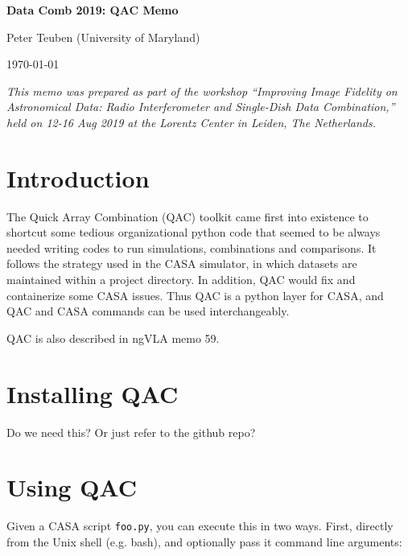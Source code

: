 \documentclass[12pt,a4paper]{article}
\begin{document}
\pagestyle{plain}
 

\begin{center}
{\Large{\bf{  Data Comb 2019: QAC Memo \\  }}} 

\end{center}
\bigskip

\centerline{Peter Teuben (University of Maryland)}

\centerline{\today}
\bigskip

\noindent \textit{This memo was prepared as part of the workshop ``Improving Image Fidelity on Astronomical Data: Radio Interferometer and Single-Dish Data Combination,'' held on 12-16 Aug 2019 at the Lorentz Center in Leiden, The Netherlands.}

\section{Introduction}

The Quick Array Combination (QAC) toolkit came first into existence to shortcut some tedious organizational python code that seemed to be always needed
writing codes to run simulations, combinations and comparisons. It follows the strategy used in the CASA simulator, in which
datasets are maintained within a project directory. In addition, QAC would fix and containerize some CASA issues. Thus QAC is a python layer for CASA,
and QAC and CASA commands can be used interchangeably.

QAC is also described in ngVLA memo 59.

\section{Installing QAC}

Do we need this?  Or just refer to the github repo?

\section{Using QAC}

Given a CASA script \verb+foo.py+, you can execute this in two ways. First, directly from the Unix shell (e.g. bash), and optionally
pass it command line arguments:
 
\begin{lstlisting}[language=bash]
    % casa --nogui -c foo.py pixel=0.1 > test1.log 2>&1
\end{lstlisting}
\end{document}
